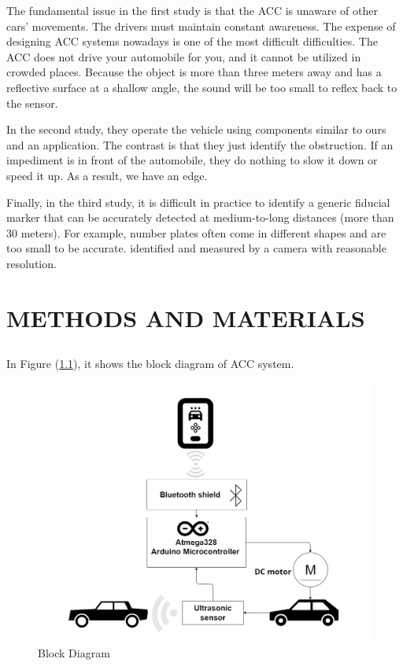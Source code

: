 \documentclass[12pt,a4paper]{report}
\begin{document}
 The fundamental issue in the first study is that the ACC is unaware of other cars' movements. The drivers must maintain constant awareness. The expense of designing ACC systems nowadays is one of the most difficult difficulties. The ACC does not drive your automobile for you, and it cannot be utilized in crowded places. Because the object is more than three meters away and has a reflective surface at a shallow angle, the sound will be too small to reflex back to the sensor.
 
 In the second study, they operate the vehicle using components similar to ours and an application. The contrast is that they just identify the obstruction. If an impediment is in front of the automobile, they do nothing to slow it down or speed it up. As a result, we have an edge.

Finally, in the third study, it is difficult in practice to identify a generic fiducial marker that can be accurately detected at medium-to-long distances (more than 30 meters). For example, number plates often come in different shapes and are too small to be accurate. identified and measured by a camera with reasonable resolution.



\chapter{METHODS AND MATERIALS}
\section{\fontsize{12}{12}\selectfont{System Design and Components}}
\subsection{\fontsize{12}{12}\selectfont{Block Diagram}}
In Figure (\ref{fig:Block Diagram}), it shows the block diagram of ACC system.
\begin{figure}[H]
    \centering
    \graphicspath{ {./images/} }
    \includegraphics[width=1\textwidth]{ACC block diagram.jpg}
    \caption{Block Diagram}
    \label{fig:Block Diagram}
\end{figure}
\break
\end{document}
